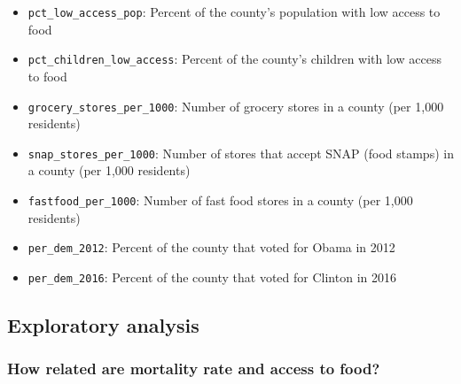 \documentclass[
]{article}
\newenvironment{Shaded}{\begin{snugshade}}{\end{snugshade}}
\newcommand{\AttributeTok}[1]{\textcolor[rgb]{0.77,0.63,0.00}{#1}}
\newcommand{\CommentTok}[1]{\textcolor[rgb]{0.56,0.35,0.01}{\textit{#1}}}
\newcommand{\FunctionTok}[1]{\textcolor[rgb]{0.00,0.00,0.00}{#1}}
\newcommand{\NormalTok}[1]{#1}
\newcommand{\SpecialCharTok}[1]{\textcolor[rgb]{0.00,0.00,0.00}{#1}}
\newcommand{\StringTok}[1]{\textcolor[rgb]{0.31,0.60,0.02}{#1}}
\providecommand{\tightlist}{%
  \setlength{\itemsep}{0pt}\setlength{\parskip}{0pt}}
\begin{document}
\begin{itemize}
\tightlist
\item
  \texttt{pct\_low\_access\_pop}: Percent of the county's population
  with low access to food
\item
  \texttt{pct\_children\_low\_access}: Percent of the county's children
  with low access to food
\item
  \texttt{grocery\_stores\_per\_1000}: Number of grocery stores in a
  county (per 1,000 residents)
\item
  \texttt{snap\_stores\_per\_1000}: Number of stores that accept SNAP
  (food stamps) in a county (per 1,000 residents)
\item
  \texttt{fastfood\_per\_1000}: Number of fast food stores in a county
  (per 1,000 residents)
\item
  \texttt{per\_dem\_2012}: Percent of the county that voted for Obama in
  2012
\item
  \texttt{per\_dem\_2016}: Percent of the county that voted for Clinton
  in 2016
\end{itemize}

\hypertarget{exploratory-analysis-1}{%
\subsection{Exploratory analysis}\label{exploratory-analysis-1}}

\hypertarget{how-related-are-mortality-rate-and-access-to-food}{%
\subsubsection{How related are mortality rate and access to
food?}\label{how-related-are-mortality-rate-and-access-to-food}}

\begin{Shaded}
\end{Shaded}
\end{document}
